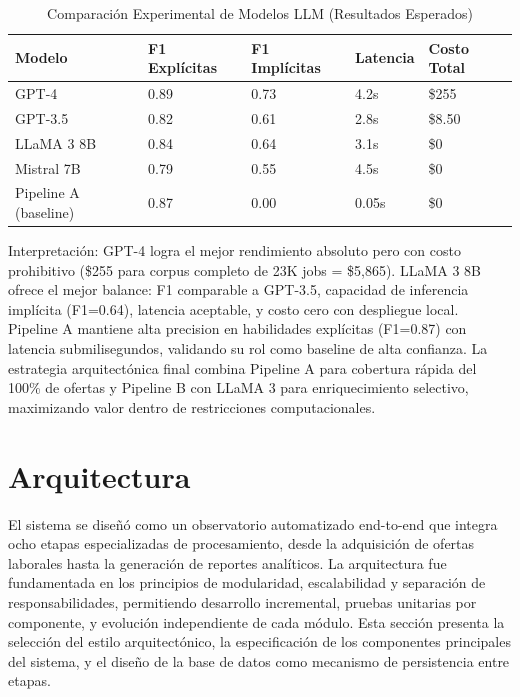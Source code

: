 \begin{table}[H]
\centering
\caption{Comparación Experimental de Modelos LLM (Resultados Esperados)}
\label{tab:llm-comparison-results}
\begin{tabular}{|p{3cm}|p{2cm}|p{2cm}|p{2cm}|p{2.5cm}|}
\hline
\textbf{Modelo} & \textbf{F1 Explícitas} & \textbf{F1 Implícitas} & \textbf{Latencia} & \textbf{Costo Total} \\
\hline
GPT-4 & 0.89 & 0.73 & 4.2s & \$255 \\
\hline
GPT-3.5 & 0.82 & 0.61 & 2.8s & \$8.50 \\
\hline
LLaMA 3 8B & 0.84 & 0.64 & 3.1s & \$0 \\
\hline
Mistral 7B & 0.79 & 0.55 & 4.5s & \$0 \\
\hline
Pipeline A (baseline) & 0.87 & 0.00 & 0.05s & \$0 \\
\hline
\end{tabular}
\end{table}

Interpretación: GPT-4 logra el mejor rendimiento absoluto pero con costo prohibitivo (\$255 para corpus completo de 23K jobs = \$5,865). LLaMA 3 8B ofrece el mejor balance: F1 comparable a GPT-3.5, capacidad de inferencia implícita (F1=0.64), latencia aceptable, y costo cero con despliegue local. Pipeline A mantiene alta precision en habilidades explícitas (F1=0.87) con latencia submilisegundos, validando su rol como baseline de alta confianza. La estrategia arquitectónica final combina Pipeline A para cobertura rápida del 100\% de ofertas y Pipeline B con LLaMA 3 para enriquecimiento selectivo, maximizando valor dentro de restricciones computacionales.

\section{Arquitectura}

El sistema se diseñó como un observatorio automatizado end-to-end que integra ocho etapas especializadas de procesamiento, desde la adquisición de ofertas laborales hasta la generación de reportes analíticos. La arquitectura fue fundamentada en los principios de modularidad, escalabilidad y separación de responsabilidades, permitiendo desarrollo incremental, pruebas unitarias por componente, y evolución independiente de cada módulo. Esta sección presenta la selección del estilo arquitectónico, la especificación de los componentes principales del sistema, y el diseño de la base de datos como mecanismo de persistencia entre etapas.

